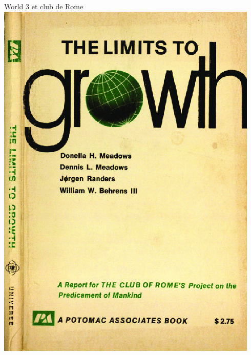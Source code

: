 \documentclass{beamer}
\begin{document}
 
\begin{frame}{World 3 et club de Rome}
\includegraphics[scale=0.1]{images/limits_to_growth.png}

\end{frame}
\end{document}
